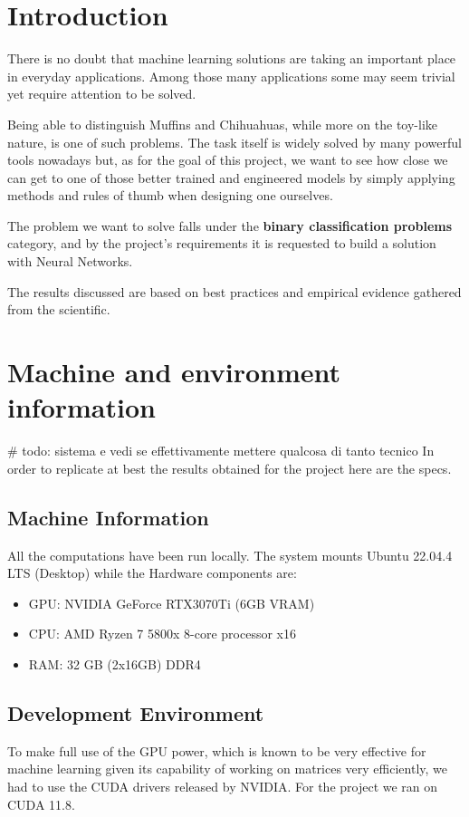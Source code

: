 \newpage
\section{Introduction}\label{sec:introduction}
There is no doubt that machine learning solutions are taking an important place in everyday applications.
Among those many applications some may seem trivial yet require attention to be solved.

Being able to distinguish Muffins and Chihuahuas, while more on the toy-like nature, is one of such problems.
The task itself is widely solved by many powerful tools nowadays but, as for the goal of this project, we
want to see how close we can get to one of those better trained and engineered models
by simply applying methods and rules of thumb when designing one ourselves.

The problem we want to solve falls under the \textbf{binary classification problems} category,
and by the project's requirements it is requested to build a solution with Neural Networks.

The results discussed are based on best practices and empirical evidence gathered from the scientific.


\section{Machine and environment information}\label{sec:machine-and-environment-information}
# todo: sistema e vedi se effettivamente mettere qualcosa di tanto tecnico
In order to replicate at best the results obtained for the project here are the specs.

\subsection{Machine Information}\label{subsec:machine-information}

All the computations have been run locally.
The system mounts Ubuntu 22.04.4 LTS (Desktop) while the Hardware components are:

\begin{itemize}
    \item GPU: NVIDIA GeForce RTX3070Ti (6GB VRAM)
    \item CPU: AMD Ryzen 7 5800x 8-core processor x16
    \item RAM: 32 GB (2x16GB) DDR4
\end{itemize}

\subsection{Development Environment}\label{subsec:development-environment}
To make full use of the GPU power, which is known to be very effective for machine learning given its
capability of working on matrices very efficiently, we had to use the CUDA drivers released by NVIDIA.
For the project we ran on CUDA 11.8.

